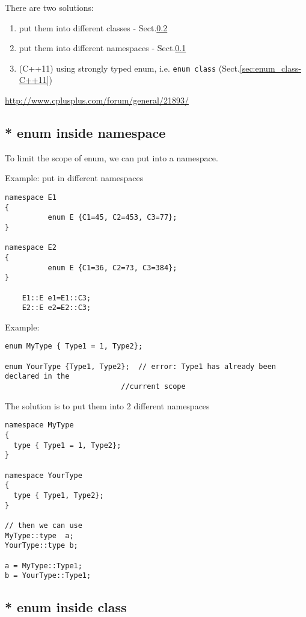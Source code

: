 There are two solutions:
\begin{enumerate}
  \item put them into different classes - Sect.\ref{sec:enum-inside-class}
  
  \item put them into different namespaces - Sect.\ref{sec:enum-inside-namespace}
  
  \item (C++11) using strongly typed enum, i.e. \verb!enum class!
  (Sect.\ref{sec:enum_class-C++11})
\end{enumerate}
\url{http://www.cplusplus.com/forum/general/21893/}

\subsection{ * enum inside namespace}
\label{sec:enum-inside-namespace}

To limit the scope of enum, we can put into a namespace.

Example: put in different namespaces
\begin{verbatim}
namespace E1
{
          enum E {C1=45, C2=453, C3=77};
}

namespace E2
{
          enum E {C1=36, C2=73, C3=384};
}

    E1::E e1=E1::C3;
    E2::E e2=E2::C3;
\end{verbatim}

Example:
\begin{verbatim}
enum MyType { Type1 = 1, Type2};
 
enum YourType {Type1, Type2};  // error: Type1 has already been declared in the
                           //current scope
\end{verbatim} 
The solution is to put them into 2 different namespaces
\begin{verbatim}
namespace MyType 
{
  type { Type1 = 1, Type2};
}

namespace YourType 
{
  type { Type1, Type2};
}

// then we can use
MyType::type  a;
YourType::type b;

a = MyType::Type1;
b = YourType::Type1;
\end{verbatim}

\subsection{ * enum inside class}
\label{sec:enum-inside-class}

